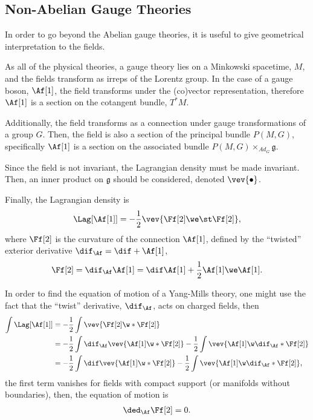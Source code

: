 \subsection{Non-Abelian Gauge Theories}

In order to go beyond the Abelian gauge theories, it is useful to give geometrical interpretation to the fields.

As all of the physical theories, a gauge theory lies on a Minkowski spacetime, $M$, and the fields transform as irreps of the Lorentz group. In the case of a gauge boson,  $\Af[1]$, the field transforms under the (co)vector representation, therefore $\Af[1]$ is a section on the cotangent bundle, $T^*M$.

Additionally, the field transforms as a connection under gauge transformations of a group $G$. Then, the field is also a section of the principal bundle $P(M,G)$, specifically $\Af[1]$ is a section on the associated bundle $P(M,G) \times_{Ad_G} \mathfrak{g}$.

Since the field is not invariant, the Lagrangian density must be made invariant. Then, an inner product on $\mathfrak{g}$ should be considered, denoted $\vev{\bullet}$.

Finally, the Lagrangian density is
\begin{align}
  \Lag[\Af[1]] = -\frac{1}{2} \vev{ \Ff[2] \we \st \Ff[2] },
\end{align}
where $\Ff[2]$ is the curvature of the connection $\Af[1]$, defined by the ``twisted'' exterior derivative $\dif_{\Af}= \dif + \Af[1]$,
\begin{align}
  \Ff[2] = \dif_{\Af} \Af[1] = \dif\Af[1] + \frac{1}{2} \Af[1] \we \Af[1].
\end{align}


\begin{WEbox}[%
    frametitle={Equations of Motion for Yang-Mills Theories},
    frametitlerule=true,
    frametitlealignment=\centering,
    frametitleaboveskip=10pt,]
  In order to find the equation of motion of a Yang-Mills theory, one might use the fact that the ``twist'' derivative, $\dif_{\Af}$, acts on charged fields, then
  \begin{align*}
    \int \Lag[\Af[1]] &=-\frac{1}{2}\int \vev{\Ff[2]\w*\Ff[2]}\\
    &=-\frac{1}{2}\int \dif_{\Af}\vev{\Af[1]\w*\Ff[2]}-\frac{1}{2}\int \vev{\Af[1]\w\dif_{\Af}*\Ff[2]}\\
    &=-\frac{1}{2}\int \dif\vev{\Af[1]\w*\Ff[2]}-\frac{1}{2}\int \vev{\Af[1]\w\dif_{\Af}*\Ff[2]},
  \end{align*}
  the first term vanishes for fields with compact support (or manifolds without boundaries), then, the equation of motion is 
  \begin{align*}
    \ded_{\Af}\Ff[2] =0.
  \end{align*}
\end{WEbox}





